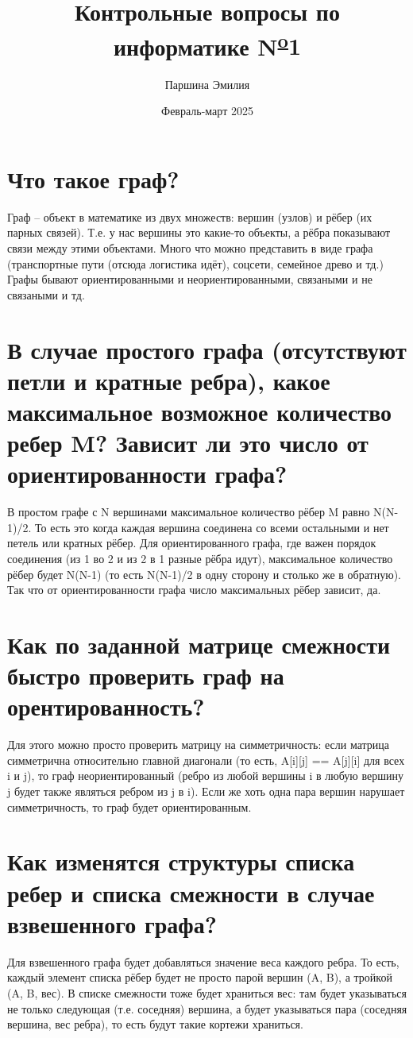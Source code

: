 \documentclass[12pt]{article}
\title{\textbf{Контрольные вопросы по информатике N\textsuperscript{\underline{o}}}1}
\author{Паршина Эмилия}
\date{Февраль-март 2025}
\begin{document}
\maketitle

\section{Что такое граф?}
Граф – объект в математике из двух множеств: вершин (узлов) и рёбер (их парных связей). Т.е. у нас вершины это какие-то объекты, а рёбра показывают связи между этими объектами. Много что можно представить в виде графа (транспортные пути (отсюда логистика идёт), соцсети, семейное древо и тд.)
Графы бывают ориентированными и неориентированными, связаными и не связаными и тд.

\section{В случае простого графа (отсутствуют петли и кратные ребра), какое максимальное возможное количество ребер M? Зависит ли это число от ориентированности графа?}
В простом графе с N вершинами максимальное количество рёбер M равно N(N-1)/2. То есть это когда каждая вершина соединена со всеми остальными и нет петель или кратных рёбер. Для ориентированного графа, где важен порядок соединения (из 1 во 2 и из 2 в 1 разные рёбра идут), максимальное количество рёбер будет N(N-1) (то есть N(N-1)/2 в одну сторону и столько же в обратную). Так что от ориентированности графа число максимальных рёбер зависит, да.

\section{Как по заданной матрице смежности быстро проверить граф на орентированность?}
Для этого можно просто проверить матрицу на симметричность: если матрица симметрична относительно главной диагонали (то есть, A[i][j] == A[j][i] для всех i и j), то граф неориентированный (ребро из любой вершины i в любую вершину j будет также являться ребром из j в i). Если же хоть одна пара вершин нарушает симметричность, то граф будет ориентированным.

\section{Как изменятся структуры списка ребер и списка смежности в случае взвешенного графа?}
Для взвешенного графа будет добавляться значение веса каждого ребра. То есть, каждый элемент списка рёбер будет не просто парой вершин (A, B), а тройкой (A, B, вес). В списке смежности тоже будет храниться вес: там будет указываться не только следующая (т.е. соседняя) вершина, а будет указываться пара (соседняя вершина, вес ребра), то есть будут такие кортежи храниться.
\end{document}
